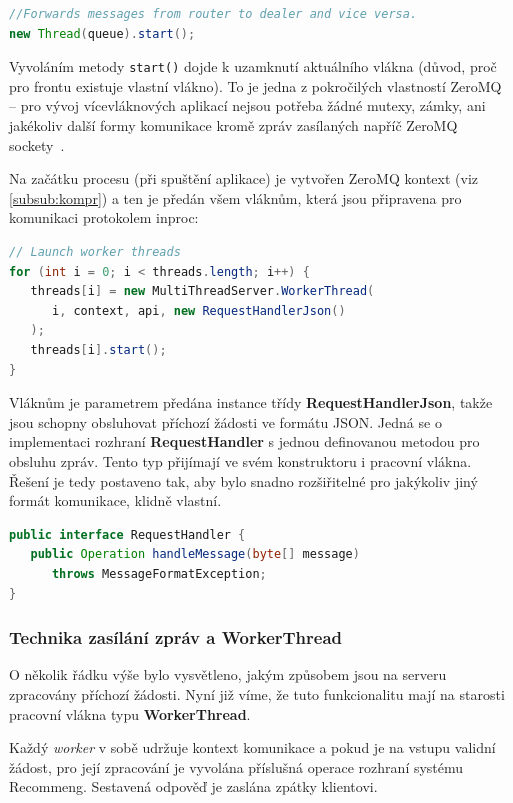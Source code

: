 \documentclass[thesis=M,czech]{FITthesis}[2014/05/07]
\begin{document}
\begin{lstlisting}[language=java]
//Forwards messages from router to dealer and vice versa.
new Thread(queue).start();
\end{lstlisting}

Vyvoláním metody \texttt{start()} dojde k uzamknutí aktuálního vlákna (důvod, proč pro frontu existuje vlastní vlákno). To je jedna z pokročilých vlastností ZeroMQ – pro vývoj vícevláknových aplikací nejsou potřeba žádné mutexy, zámky, ani jakékoliv další formy komunikace kromě zpráv zasílaných napříč ZeroMQ sockety~\cite{mtserver}.

Na začátku procesu (při spuštění aplikace) je vytvořen ZeroMQ kontext (viz \ref{subsub:kompr}) a ten je předán všem vláknům, která jsou připravena pro komunikaci protokolem inproc:

\begin{lstlisting}[language=java]
// Launch worker threads
for (int i = 0; i < threads.length; i++) {
   threads[i] = new MultiThreadServer.WorkerThread(
      i, context, api, new RequestHandlerJson()
   );
   threads[i].start();
}
\end{lstlisting}

Vláknům je parametrem předána instance třídy \textbf{RequestHandlerJson}, takže jsou schopny obsluhovat příchozí žádosti ve formátu JSON. Jedná se o implementaci rozhraní \textbf{RequestHandler} s jednou definovanou metodou pro obsluhu zpráv. Tento typ přijímají ve svém konstruktoru i pracovní vlákna. Řešení je tedy postaveno tak, aby bylo snadno rozšiřitelné pro jakýkoliv jiný formát komunikace, klidně vlastní.

\begin{lstlisting}[language=java]
public interface RequestHandler {
   public Operation handleMessage(byte[] message)
      throws MessageFormatException;
}
\end{lstlisting}

\subsubsection{Technika zasílání zpráv a WorkerThread}
O několik řádku výše bylo vysvětleno, jakým způsobem jsou na serveru zpracovány příchozí žádosti. Nyní již víme, že tuto funkcionalitu mají na starosti pracovní vlákna typu \textbf{WorkerThread}.

Každý \emph{worker} v sobě udržuje kontext komunikace a pokud je na vstupu validní žádost, pro její zpracování je vyvolána příslušná operace rozhraní systému Recommeng. Sestavená odpověď je zaslána zpátky klientovi.
\end{document}
